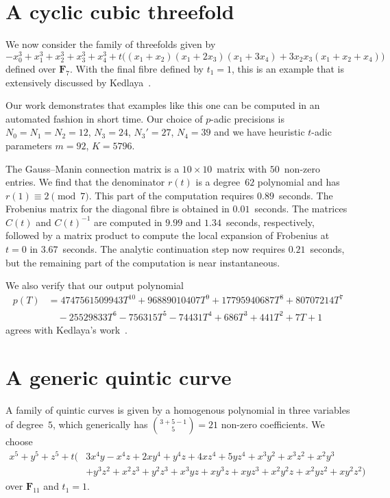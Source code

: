 \section{A cyclic cubic threefold}

We now consider the family of threefolds given by 
\begin{equation}
-x_0^3 + x_1^3 + x_2^3 + x_3^3 + x_4^3 
+ t\bigl((x_1+x_2)(x_1+2x_3)(x_1+3x_4) + 3 x_2 x_3 (x_1 + x_2 + x_4)\bigr) 
\end{equation}
defined over $\mathbf{F}_{7}$.  With the final fibre defined by $t_1 = 1$, 
this is an example that is extensively discussed by 
Kedlaya~\citep[Example~1.6.1]{Kedlaya2011}.  

Our work demonstrates that examples like this one can be computed in an 
automated fashion in short time.  Our choice of $p$-adic precisions is 
$N_0 = N_1 = N_2 = 12$, $N_3 = 24$, $N_3' = 27$, $N_4 = 39$ and 
we have heuristic $t$-adic parameters $m = 92$, $K = 5796$.

The Gauss--Manin connection matrix is a $10 \times 10$~matrix with 
$50$~non-zero entries.  We find that the denominator $r(t)$ is a degree~$62$ 
polynomial and has $r(1) \equiv 2 \pmod{7}$.  This part of the computation 
requires $0.89$~seconds.  The Frobenius matrix for the diagonal fibre is 
obtained in $0.01$~seconds.  The matrices $C(t)$ and $C(t)^{-1}$ are 
computed in $9.99$ and $1.34$~seconds, respectively, followed by a matrix 
product to compute the local expansion of Frobenius at $t = 0$ in 
$3.67$~seconds.  The analytic continuation step now requires $0.21$~seconds, 
but the remaining part of the computation is near instantaneous.

We also verify that our output polynomial 
\begin{equation*}
\begin{split}
p(T) & = 4747561509943 T^{10}+96889010407 T^9+17795940687 T^8 +80707214 T^7 \\
& \quad -25529833 T^6 
-756315 T^5-74431 T^4+686 T^3+441 T^2+7 T+1
\end{split}
\end{equation*}
agrees with Kedlaya's work~\citep[p.~20]{Kedlaya2011}.

\section{A generic quintic curve}

A family of quintic curves is given by a homogenous polynomial 
in three variables of degree~$5$, which generically has 
$\binom{3+5-1}{5} = 21$ non-zero coefficients.  We choose 
\begin{equation*}
\begin{split}
x^5 + y^5 + z^5 + t \bigl( 
& 3 x^4 y - x^4 z + 2 x y^4 + y^4 z + 4 x z^4 + 5 y z^4 + x^3 y^2 + x^3 z^2 + x^2 y^3 \\
& + y^3 z^2 + x^2 z^3 + y^2 z^3 + x^3 y z + x y^3 z + x y z^3 + x^2 y^2 z + x^2 y z^2 + x y^2 z^2 \bigr)
\end{split}
\end{equation*}
over $\mathbf{F}_{11}$ and $t_1 = 1$.

